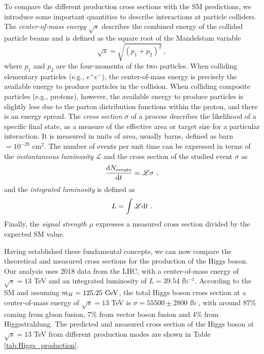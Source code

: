 To compare the different production cross sections with the SM predictions, we introduce some important quantities to describe interactions at particle colliders. The \textit{center-of-mass energy} $\sqrt{s}$ describes the combined energy of the collided particle beams and is defined as the square root of the Mandelstam variable
\begin{equation*}
\sqrt{s} = \sqrt{(p_1+p_2)^2}\ ,
\end{equation*}
where $p_1$ and $p_2$ are the four-momenta of the two particles. When colliding elementary particles (e.g., $e^+e^-$), the center-of-mass energy is precisely the available energy to produce particles in the collision. When colliding composite particles (e.g., protons), however, the available energy to produce particles is slightly less due to the parton distribution functions within the proton, and there is an energy spread. The \textit{cross section} $\sigma$ of a process describes the likelihood of a specific final state, as a measure of the effective area or target size for a particular interaction. It is measured in units of area, usually barns, defined as barn $= 10^{-28}$ cm$^{2}$. The number of events per unit time can be expressed in terms of the \textit{instantaneous luminosity} $\mathscr{L}$ and the cross section of the studied event $\sigma$ as
\begin{equation*}
    \frac{\text{d} N_{\text{events}}}{\text{d} t} = \mathscr{L}\sigma\ ,
\end{equation*}
and the \textit{integrated luminosity} is defined as 
\begin{equation*}
    L = \int\mathscr{L}\d t\ .
\end{equation*}
Finally, the \textit{signal strength} $\mu$ expresses a measured cross section divided by the expected SM value.

Having established these fundamental concepts, we can now compare the theoretical and measured cross sections for the production of the Higgs boson. Our analysis uses 2018 data from the LHC, with a center-of-mass energy of $\sqrt{s} = 13$ TeV and an integrated luminosity of $L=39.54$ fb$^{-1}$. According to the SM and assuming $m_H = 125.25\ \text{GeV}$, the total Higgs boson cross section at a center-of-mass energy of $\sqrt{s} = 13$ TeV is $\sigma = 55500 \pm 2800$ fb \cite{LHCHiggsCrossSectionWorkingGroup:2016ypw}, with around 87\% coming from gluon fusion, 7\% from vector boson fusion and 4\% from Higgsstrahlung. The predicted and measured cross section of the Higgs boson at $\sqrt{s} = 13$ TeV from different production modes are shown in Table \ref{tab:Higgs_production}.

